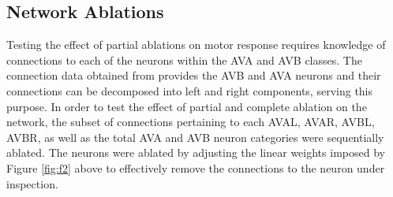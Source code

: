 \documentclass[11pt]{article} %
\begin{document}
\clearpage
\subsection{Network Ablations}
Testing the effect of partial ablations on motor response requires knowledge of connections to each of the neurons within the AVA and AVB classes. The connection data obtained from \cite{Oshio2003} provides the AVB and AVA neurons and their connections can be decomposed into left and right components, serving this purpose. In order to test the effect of partial and complete ablation on the network, the subset of connections pertaining to each AVAL, AVAR, AVBL, AVBR, as well as the total AVA and AVB neuron categories were sequentially ablated. The neurons were ablated by adjusting the linear weights imposed by Figure \ref{fig:f2} above to effectively remove the connections to the neuron under inspection.
\end{document}
